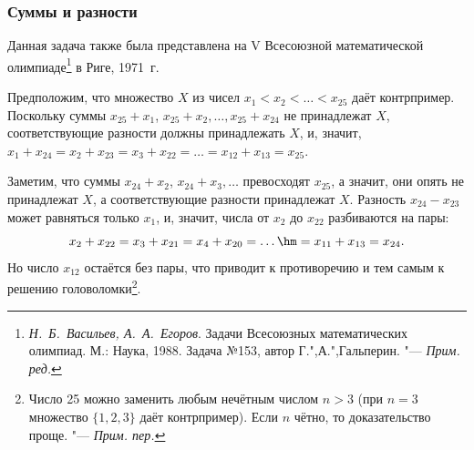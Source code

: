 \documentclass[twoside]{book}
\newcommand\VsMO{\emph{Н.~Б.~Васильев, А.~А.~Егоров}. Задачи Всесоюзных математических олимпиад. М.: Наука, 1988}
\begin{document}
\subsubsection*{Суммы и разности}%

Данная задача  также была представлена на V Всесоюзной математической олимпиаде\footnote{%
\VsMO. Задача №153, автор  Г.",А.",Гальперин. "--- \emph{Прим. ред.}} в Риге, 1971~г.%

\medskip



Предположим, что множество $X$ из чисел $x_1 < x_2 < \ldots < x_{25}$ даёт контрпример.
Поскольку суммы $x_{25} + x_1$, $x_{25} + x_2,\dots, x_{25} + x_{24}$ не принадлежат $X$,
соответствующие разности должны принадлежать $X$,
и, значит,
\(x_1 + x_{24} = x_2 + x_{23} = x_3 + x_{22}  =\ldots = x_{12} + x_{13} = x_{25}.\)


Заметим, что суммы $x_{24} + x_2$, $x_{24} + x_3,\dots$ превосходят $x_{25}$, а значит, они опять не принадлежат $X$, а
соответствующие разности принадлежат $X$.
Разность
$x_{24} - x_{23}$ может равняться только $x_1$, и, значит, числа от
$x_2$ до $x_{22}$ разбиваются на пары:
\[x_2 + x_{22} = x_3 + x_{21} = x_4 + x_{20} =\ldots\hm= x_{11} + x_{13} = x_{24}.\]
Но число $x_{12}$ остаётся без пары, что приводит к противоречию и тем самым к решению головоломки\footnote{Число 25 можно заменить любым нечётным числом $n> 3$ (при $n=3$ множество $\{1,2,3\}$ даёт контрпример).
Если $n$ чётно, то доказательство проще. "--- \emph{Прим. пер.}}.
\heart
\end{document}

